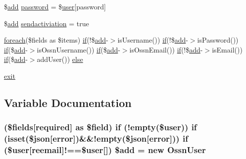 \begin{DoxyCompactItemize}
\item 
\$\hyperlink{theme_8min_8js_a79ed6f45c867c160601f70dfa5ec2f95}{add} \hyperlink{register_8php_a3ef39d3ee8b2bcca6a288308549ccb44}{password} = \$\hyperlink{ossn_8config_8db_8example_8php_a802544b7ba9f79bbf24ef67773d53bed}{user}\mbox{[}\textquotesingle{}password\textquotesingle{}\mbox{]}
\item 
\$\hyperlink{theme_8min_8js_a79ed6f45c867c160601f70dfa5ec2f95}{add} \hyperlink{register_8php_a11fe66faec6579a15979e62879ba8950}{sendactiviation} = true
\item 
\hyperlink{user__timeline_8php_a1b18c909b5f0affc85267f294d947c4b}{foreach}(\$fields as \$items) \hyperlink{jquery_8tokeninput_8js_ad8dd46a3cbc004569e34401e9e71771a}{if}(!\$\hyperlink{theme_8min_8js_a79ed6f45c867c160601f70dfa5ec2f95}{add}-\/$>$is\+Username()) \hyperlink{jquery_8tokeninput_8js_ad8dd46a3cbc004569e34401e9e71771a}{if}(!\$\hyperlink{theme_8min_8js_a79ed6f45c867c160601f70dfa5ec2f95}{add}-\/$>$is\+Password()) \hyperlink{jquery_8tokeninput_8js_ad8dd46a3cbc004569e34401e9e71771a}{if}(\$\hyperlink{theme_8min_8js_a79ed6f45c867c160601f70dfa5ec2f95}{add}-\/$>$is\+Ossn\+Username()) \hyperlink{jquery_8tokeninput_8js_ad8dd46a3cbc004569e34401e9e71771a}{if}(\$\hyperlink{theme_8min_8js_a79ed6f45c867c160601f70dfa5ec2f95}{add}-\/$>$is\+Ossn\+Email()) \hyperlink{jquery_8tokeninput_8js_ad8dd46a3cbc004569e34401e9e71771a}{if}(!\$\hyperlink{theme_8min_8js_a79ed6f45c867c160601f70dfa5ec2f95}{add}-\/$>$is\+Email()) \hyperlink{jquery_8tokeninput_8js_ad8dd46a3cbc004569e34401e9e71771a}{if}(\$\hyperlink{theme_8min_8js_a79ed6f45c867c160601f70dfa5ec2f95}{add}-\/$>$add\+User()) \hyperlink{register_8php_a5df0ed50681564b6d88356ea22856eac}{else}
\item 
\hyperlink{register_8php_a6733eb5f605d09eaede9845835d71c4e}{exit}
\end{DoxyCompactItemize}


\subsection{Variable Documentation}
\subsubsection[{\texorpdfstring{\$add}{$add}}]{ (\$fields\mbox{[}\textquotesingle{}required\textquotesingle{}\mbox{]} as \$field) {\bf if} (!empty(\${\bf user})) {\bf if} (isset(\$json\mbox{[}\textquotesingle{}error\textquotesingle{}\mbox{]})\&\&!empty(\$json\mbox{[}\textquotesingle{}error\textquotesingle{}\mbox{]})) {\bf if} (\${\bf user}\mbox{[}\textquotesingle{}reemail\textquotesingle{}\mbox{]}!==\${\bf user}\mbox{[}\textquotesingle{}\mbox{]}) \${\bf add} = new {\bf Ossn\+User}}\hypertarget{register_8php_a8a220b45d1ed546b874dde7e0ac4644f}{}\label{register_8php_a8a220b45d1ed546b874dde7e0ac4644f}


